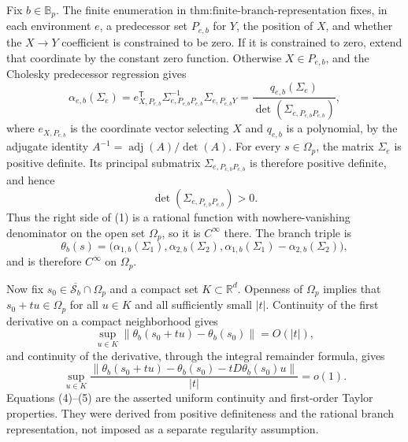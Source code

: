 Fix \(b\in\mathbb B_p\). The finite enumeration in \(\text{thm:finite-branch-representation}\) fixes, in each environment \(e\), a predecessor set \(P_{e,b}\) for \(Y\), the position of \(X\), and whether the \(X\to Y\) coefficient is constrained to be zero. If it is constrained to zero, extend that coordinate by the constant zero function. Otherwise \(X\in P_{e,b}\), and the Cholesky predecessor regression gives
\[
 \alpha_{e,b}(\Sigma_e)
 =e_{X,P_{e,b}}^{\mathsf T}
   \Sigma_{e,P_{e,b}P_{e,b}}^{-1}
   \Sigma_{e,P_{e,b}Y}
 =\frac{q_{e,b}(\Sigma_e)}
        {\det(\Sigma_{e,P_{e,b}P_{e,b}})},
 \tag{1}
\]
where \(e_{X,P_{e,b}}\) is the coordinate vector selecting \(X\) and \(q_{e,b}\) is a polynomial, by the adjugate identity \(A^{-1}=\operatorname{adj}(A)/\det(A)\). For every \(s\in\Omega_p\), the matrix \(\Sigma_e\) is positive definite. Its principal submatrix \(\Sigma_{e,P_{e,b}P_{e,b}}\) is therefore positive definite, and hence
\[
 \det(\Sigma_{e,P_{e,b}P_{e,b}})>0.
 \tag{2}
\]
Thus the right side of (1) is a rational function with nowhere-vanishing denominator on the open set \(\Omega_p\), so it is \(C^\infty\) there. The branch triple is
\[
 \theta_b(s)=
 \bigl(\alpha_{1,b}(\Sigma_1),
       \alpha_{2,b}(\Sigma_2),
       \alpha_{1,b}(\Sigma_1)-\alpha_{2,b}(\Sigma_2)\bigr),
 \tag{3}
\]
and is therefore \(C^\infty\) on \(\Omega_p\).

Now fix \(s_0\in\overline{\mathcal S_b}\cap\Omega_p\) and a compact set \(K\subset\mathbb R^d\). Openness of \(\Omega_p\) implies that \(s_0+t u\in\Omega_p\) for all \(u\in K\) and all sufficiently small \(|t|\). Continuity of the first derivative on a compact neighborhood gives
\[
 \sup_{u\in K}\|\theta_b(s_0+t u)-\theta_b(s_0)\|=O(|t|),
 \tag{4}
\]
and continuity of the derivative, through the integral remainder formula, gives
\[
 \sup_{u\in K}
 \frac{\|\theta_b(s_0+t u)-\theta_b(s_0)
 -tD\theta_b(s_0)u\|}{|t|}=o(1).
 \tag{5}
\]
Equations (4)--(5) are the asserted uniform continuity and first-order Taylor properties. They were derived from positive definiteness and the rational branch representation, not imposed as a separate regularity assumption.